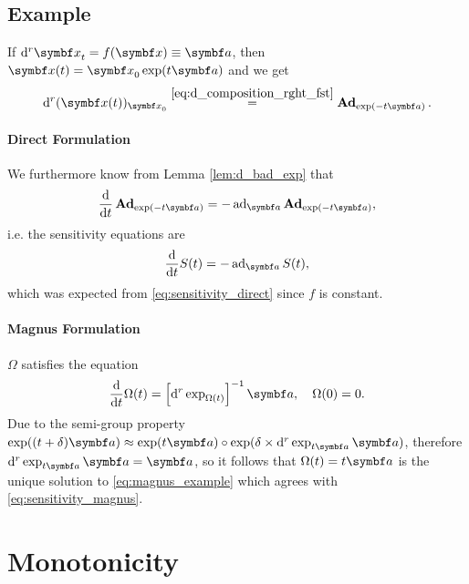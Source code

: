 \subsection{Example}


\begin{example}
  If $\mathrm{d}^{r} \x_{t} = f(\x) \equiv \a$, then $\x(t) = \x_{0} \exp(t \a)$ and we get
  \begin{equation}
    \mathrm{d}^{r} (\x(t))_{\x_{0}} \overset{\eqref{eq:d_composition_rght_fst}} = \bAd_{\exp(-t \a)}.
  \end{equation}

  \paragraph{Direct Formulation}
  We furthermore know from Lemma \ref{lem:d_bad_exp} that
  \begin{equation}
    \label{eq:1}
    \frac{\mathrm{d}}{\mathrm{d}t} \bAd_{\exp(-t \a)} = -\ad_{\a} \bAd_{\exp(-t \a)},
  \end{equation}
  i.e. the sensitivity equations are
  \begin{equation}
    \label{eq:13}
    \frac{\mathrm{d}}{\mathrm{d}t} S(t) = -\ad_{\a} S(t),
  \end{equation}
  which was expected from \eqref{eq:sensitivity_direct} since $f$ is constant.

  \paragraph{Magnus Formulation}

  $\Omega$ satisfies the equation
  \begin{equation}
    \label{eq:magnus_example}
    \frac{\mathrm{d}}{\mathrm{d}t} \Omega(t) = \left[ \mathrm{d}^{r} \exp_{\Omega(t)} \right]^{-1} \a, \quad \Omega(0) = 0.
  \end{equation}
  Due to the semi-group property $\exp((t + \delta) \a) \approx \exp(t \a) \circ \exp(\delta \times \mathrm{d}^{r} \exp_{t \a} \a)$, therefore $\mathrm{d}^{r} \exp_{t \a} \a = \a$, so it follows that $\Omega(t) = t \a$ is the unique solution to \eqref{eq:magnus_example} which agrees with \eqref{eq:sensitivity_magnus}.
\end{example}


\section{Monotonicity}

